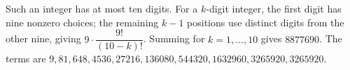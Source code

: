 Such an integer has at most ten digits. For a $k$-digit integer, the first digit has nine nonzero choices; the remaining $k-1$ positions use distinct digits from the other nine, giving $9\cdot\dfrac{9!}{(10-k)!}$. Summing for $k=1,\ldots,10$ gives $\boxed{8877690}$. The terms are $9,81,648,4536,27216,136080,544320,1632960,3265920,3265920$.
